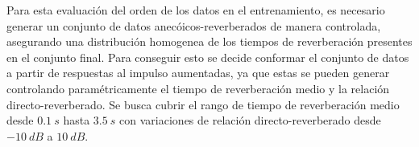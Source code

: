 Para esta evaluación del orden de los datos en el entrenamiento, es necesario generar un conjunto de datos anecóicos-reverberados de manera controlada, asegurando una distribución homogenea de los tiempos de reverberación presentes en el conjunto final. Para conseguir esto se decide conformar el conjunto de datos a partir de respuestas al impulso aumentadas, ya que estas se pueden generar controlando paramétricamente el tiempo de reverberación medio y la relación directo-reverberado. Se busca cubrir el rango de tiempo de reverberación medio desde $0.1 \ s$ hasta $3.5 \ s$ con variaciones de relación directo-reverberado desde $-10 \ dB$ a $10 \ dB$. 











